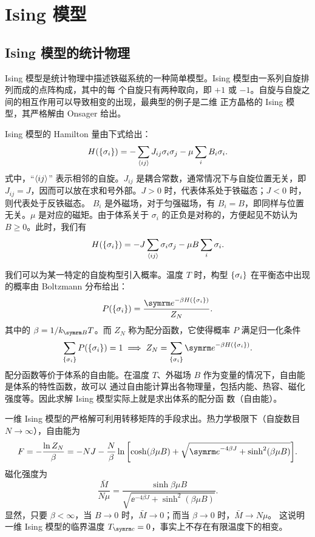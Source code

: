 \chapter{Ising 模型}

\section{Ising 模型的统计物理}

Ising 模型是统计物理中描述铁磁系统的一种简单模型。Ising 模型由一系列自旋排列而成的点阵构成，其中的每
个自旋只有两种取向，即 $+1$ 或 $-1$。自旋与自旋之间的相互作用可以导致相变的出现，最典型的例子是二维
正方晶格的 Ising 模型，其严格解由 Onsager 给出。

Ising 模型的 Hamilton 量由下式给出：
\begin{equation}
  H({\{\sigma_i\}}) = -\sum_{\langle ij\rangle} J_{ij}\sigma_i\sigma_j - \mu \sum_{i} B_i\sigma_i.
\end{equation}
式中，“$\langle ij\rangle$” 表示相邻的自旋。$J_{ij}$ 是耦合常数，通常情况下与自旋位置无关，即
$J_{ij}=J$，因而可以放在求和号外部。$J>0$ 时，代表体系处于铁磁态；$J<0$ 时，则代表处于反铁磁态。
$B_i$ 是外磁场，对于匀强磁场，有 $B_i=B$，即同样与位置无关。$\mu$ 是对应的磁矩。由于体系关于
$\sigma_i$ 的正负是对称的，方便起见不妨认为 $B \geqslant 0$。此时，我们有
\begin{equation}
  H({\{\sigma_i\}}) = -J \sum_{\langle ij\rangle} \sigma_i\sigma_j - \mu B \sum_{i} \sigma_i.
\end{equation}

我们可以为某一特定的自旋构型引入概率。温度 $T$ 时，构型 ${\{\sigma_i\}}$ 在平衡态中出现的概率由
Boltzmann 分布给出：
\begin{equation}
  P(\q{\sigma_i}) = \frac{\ee^{-\beta H(\q{\sigma_i})}}{Z_N}.
\end{equation}
其中的 $\beta=1/\kB T$。而 $Z_N$ 称为配分函数，它使得概率 $P$ 满足归一化条件
\begin{equation}
  \sum_\q{\sigma_i} P(\q{\sigma_i}) = 1
  \implies Z_N = \sum_\q{\sigma_i} \ee^{-\beta H(\q{\sigma_i})}.
\end{equation}
配分函数等价于体系的自由能。在温度 $T$、外磁场 $B$ 作为变量的情况下，自由能是体系的特性函数，故可以
通过自由能计算出各物理量，包括内能、热容、磁化强度等。因此求解 Ising 模型实际上就是求出体系的配分函
数（自由能）。

一维 Ising 模型的严格解可利用转移矩阵的手段求出。热力学极限下（自旋数目 $N\to\infty$），自由能为
\begin{equation}
  F = - \frac{\ln Z_N}{\beta}
    = - N J - \frac{N}{\beta}
              \ln\qty[\cosh(\beta\mu B) + \sqrt{\ee^{-4\beta J} + \sinh^2(\beta\mu B)}].
\end{equation}
磁化强度为
\begin{equation}
  \frac{\bar{M}}{N\mu} = \frac{\sinh{\beta\mu B}}{\sqrt{\ee^{-4\beta J} + \sinh^2(\beta\mu B)}}.
\end{equation}
显然，只要 $\beta<\infty$，当 $B\to 0$ 时，$\bar{M}\to 0$；而当 $\beta\to 0$ 时，$\bar{M}\to N\mu$。
这说明一维 Ising 模型的临界温度 $\Tc=0$，事实上不存在有限温度下的相变。

